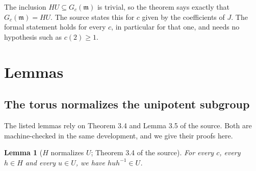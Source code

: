 \documentclass[11pt]{article}
\newtheorem{lemma}[theorem]{Lemma}
\theoremstyle{definition}
\theoremstyle{remark}
\newcommand{\Gm}{G_c(\mathfrak{m})}
\begin{document}
The inclusion $HU\subseteq\Gm$ is trivial, so the theorem says exactly that $\Gm=HU$. The source states this for $c$ given by the coefficients of $J$. The formal statement holds for every $c$, in particular for that one, and needs no hypothesis such as $c(2)\ge 1$.

\section{Lemmas}

\subsection{The torus normalizes the unipotent subgroup}

The listed lemmas rely on Theorem 3.4 and Lemma 3.5 of the source. Both are machine-checked in the same development, and we give their proofs here.

\begin{lemma}[$H$ normalizes $U$; Theorem 3.4 of the source]
For every $c$, every $h\in H$ and every $u\in U$, we have $huh^{-1}\in U$.
\end{lemma}
\end{document}
